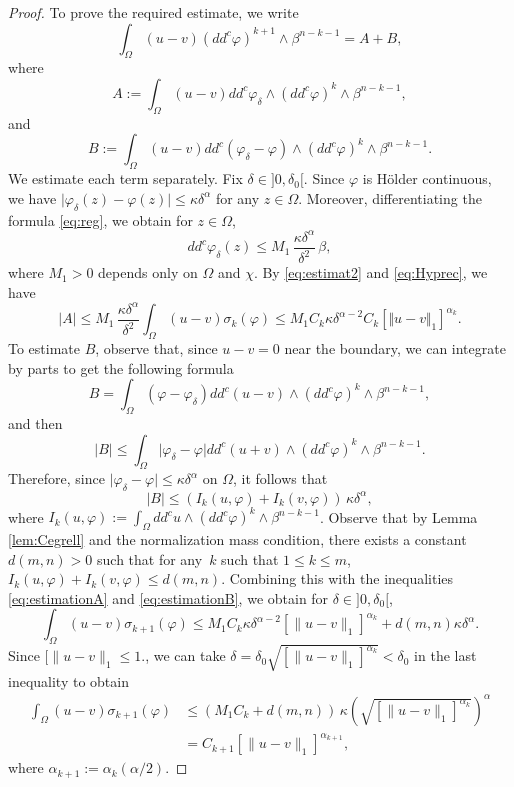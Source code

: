 \documentclass[JEP,XML,SOM,Unicode]{cedram}
\theoremstyle{definition}
\begin{document}
\begin{proof}
To prove the required estimate, we write
\[
\int_{\Omega}(u-v) (dd^c\varphi)^{k+1} \wedge\beta^{n-k-1} = A + B,
\]
where
\[
A:=\int_{\Omega}(u-v)dd^c \varphi_{\delta}\wedge(dd^c\varphi)^k\wedge\beta^{n-k-1},
\]
and
\[
B := \int_{\Omega}(u-v) dd^c(\varphi_{\delta}-\varphi)\wedge(dd^c\varphi)^k\wedge\beta^{n-k-1}.
\]
We estimate each term separately.
Fix $\delta\in{}]0,\delta_0[$. Since $\varphi$ is Hölder continuous, we have $\vert \varphi_{\delta} (z) - \varphi (z)\vert \leq \kappa \delta^{\alpha}$ for any $z \in \Omega$. Moreover, differentiating the formula \eqref{eq:reg}, we obtain for $z \in \Omega$,
\begin{equation} \label{eq:estimat2}
dd^c \varphi_{\delta} (z) \leq M_1\, \frac{ \kappa \delta^{\alpha}}{\delta^2}\, \beta,
\end{equation}
where $M_1 > 0$ depends only on $\Omega$ and $\chi$. By \eqref{eq:estimat2} and \eqref{eq:Hyprec}, we have
\begin{equation} \label{eq:estimationA}
|A|\leq M_1\, \frac{\kappa \delta^{\alpha}}{\delta^2} \int_{\Omega}(u-v) \sigma_{k}(\varphi)
\leq M_1 C_k \kappa \delta^{\alpha - 2} C_{k} \left[\Vert u-v \Vert_1\right]^{\alpha_k}.
\end{equation}
To estimate $B$, observe that, since $ u - v = 0$ near the boundary, we can integrate by parts to get the following formula
\[
B = \int_{\Omega} (\varphi-\varphi_{\delta}) dd^c (u-v) \wedge(dd^c\varphi)^k\wedge\beta^{n-k-1},
\]
and then
\[
\vert B\vert \leq \int_{\Omega} \vert \varphi_{\delta}-\varphi\vert dd^c (u+v) \wedge(dd^c\varphi)^k\wedge\beta^{n-k-1}.
\]
Therefore, since $\vert \varphi_{\delta}-\varphi \vert \leq \kappa \delta^{\alpha}$ on $\Omega$, it follows that
\begin{equation} \label{eq:estimationB}
|B| \leq( I_k(u,\varphi) + I_k(v,\varphi) ) \, \kappa \delta^{\alpha},
\end{equation}
where $I_k (u,\varphi):= \int_{\Omega} dd^c u \wedge(dd^c\varphi)^k\wedge\beta^{n-k-1}$. Observe that by Lemma \ref{lem:Cegrell} and the normalization mass condition, there exists a constant $d(m,n) > 0$ such that for any~$k$ such that $1 \leq k \leq m$, $I_k(u,\varphi) + I_k(v,\varphi) \leq d (m,n)$. Combining this with the inequalities \eqref{eq:estimationA} and \eqref{eq:estimationB}, we obtain for $\delta\in{}]0,\delta_0[$,
\[
\int_{\Omega}(u-v) \sigma_{k +1}(\varphi)\leq M_1 C_k \kappa \delta^{\alpha- 2} [\|u-v\|_1]^{\alpha_k}+ d(m,n) \kappa \delta^{\alpha}.
\]
Since $ [\|u-v\|_1 \leq 1$., we can take $\delta= \delta_0 \sqrt{ [\|u-v\|_1]^{\alpha_k}} < \delta_0$ in the last inequality to obtain
\begin{align*}
\int_{\Omega}(u-v) \sigma_{k+1}(\varphi) &\leq (M_1 C_k + d (m,n))\, \kappa \left(\sqrt{ [\|u-v\|_1]^{\alpha_k}}\right)^{\alpha} \\
& = C_{k + 1} [\|u-v\|_1]^{\alpha_{k+ 1}},
\end{align*}
where $\alpha_{k + 1}:= \alpha_k (\alpha \slash 2)$.
\end{proof}
\end{document}
